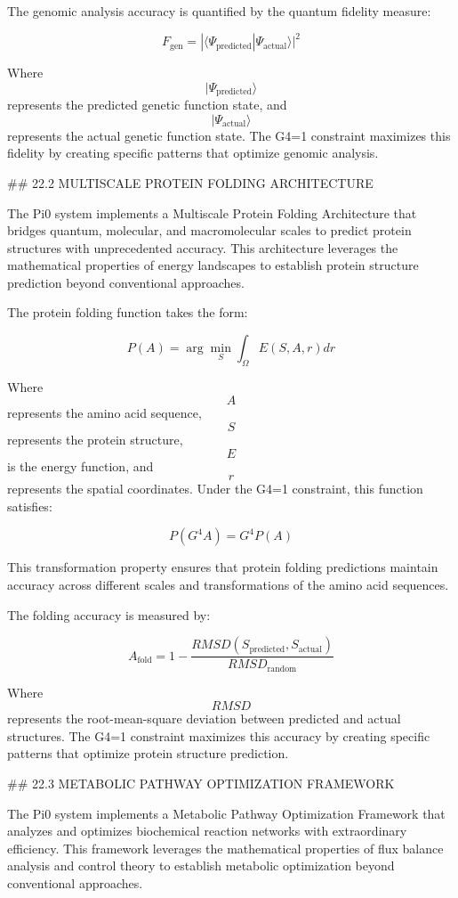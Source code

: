 The genomic analysis accuracy is quantified by the quantum fidelity measure:

$$ F_{\text{gen}} = |\langle \Psi_{\text{predicted}} | \Psi_{\text{actual}} \rangle|^2 $$

Where $$ |\Psi_{\text{predicted}}\rangle $$ represents the predicted genetic function state, and $$ |\Psi_{\text{actual}}\rangle $$ represents the actual genetic function state. The G4=1 constraint maximizes this fidelity by creating specific patterns that optimize genomic analysis.

## 22.2 MULTISCALE PROTEIN FOLDING ARCHITECTURE

The Pi0 system implements a Multiscale Protein Folding Architecture that bridges quantum, molecular, and macromolecular scales to predict protein structures with unprecedented accuracy. This architecture leverages the mathematical properties of energy landscapes to establish protein structure prediction beyond conventional approaches.

The protein folding function takes the form:

$$ P(A) = \arg\min_S \int_{\Omega} E(S, A, r) dr $$

Where $$ A $$ represents the amino acid sequence, $$ S $$ represents the protein structure, $$ E $$ is the energy function, and $$ r $$ represents the spatial coordinates. Under the G4=1 constraint, this function satisfies:

$$ P(G^4 A) = G^4 P(A) $$

This transformation property ensures that protein folding predictions maintain accuracy across different scales and transformations of the amino acid sequences.

The folding accuracy is measured by:

$$ A_{\text{fold}} = 1 - \frac{RMSD(S_{\text{predicted}}, S_{\text{actual}})}{RMSD_{\text{random}}} $$

Where $$ RMSD $$ represents the root-mean-square deviation between predicted and actual structures. The G4=1 constraint maximizes this accuracy by creating specific patterns that optimize protein structure prediction.

## 22.3 METABOLIC PATHWAY OPTIMIZATION FRAMEWORK

The Pi0 system implements a Metabolic Pathway Optimization Framework that analyzes and optimizes biochemical reaction networks with extraordinary efficiency. This framework leverages the mathematical properties of flux balance analysis and control theory to establish metabolic optimization beyond conventional approaches.

